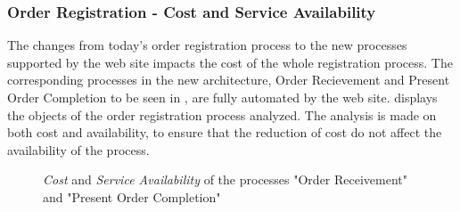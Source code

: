 \subsubsection{Order Registration - Cost and Service Availability}
The changes from today's order registration process to the new processes supported by the web site impacts the cost of the whole registration process. The corresponding processes in the new architecture, Order Recievement and Present Order Completion to be seen in , are fully automated by the web site.  displays the objects of the order registration process analyzed. The analysis is made on both cost and availability, to ensure that the reduction of cost do not affect the availability of the process.
\label{sec:order_analysis}
\begin{center}
	\begin{figure}[H]
		\centering
		\setlength\fboxsep{7pt}
		\setlength\fboxrule{0.5pt}
		\caption{\textsl{Cost} and \textsl{Service Availability} of the processes "Order Receivement" and "Present Order Completion"}
		\label{fig:map_order_cost_to_be}
	\end{figure}
\end{center}
